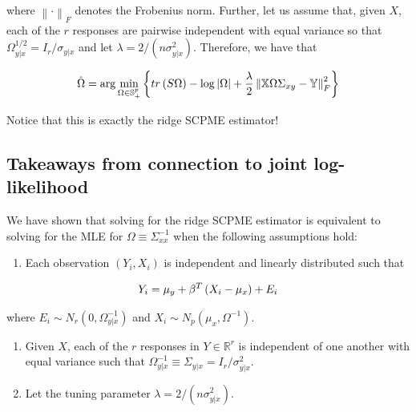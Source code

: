 \documentclass[11pt,]{report}
\providecommand{\tightlist}{%
  \setlength{\itemsep}{0pt}\setlength{\parskip}{0pt}}
\begin{document}
where \(\left\|\cdot\right\|_{F}\) denotes the Frobenius norm. Further, let us assume that, given \(X\), each of the \(r\) responses are pairwise independent with equal variance so that \(\Omega_{y | x}^{1/2} = I_{r}/\sigma_{y | x}\) and let \(\lambda = 2/(n\sigma_{y | x}^{2})\). Therefore, we have that

\begin{equation}
\hat{\Omega} = \arg\min_{\Omega \in \mathbb{S}_{+}^{p}}\left\{ tr\left( S\Omega \right) - \log\left| \Omega \right| + \frac{\lambda}{2}\left\| \mathbb{X}\Omega\Sigma_{xy} - \mathbb{Y} \right\|_{F}^{2} \right\}
\label{eq:omegajointmle}\notag
\end{equation}

Notice that this is exactly the ridge SCPME estimator!

\hypertarget{takeaways-from-connection-to-joint-log-likelihood}{%
\subsection{Takeaways from connection to joint log-likelihood}\label{takeaways-from-connection-to-joint-log-likelihood}}

We have shown that solving for the ridge SCPME estimator is equivalent to solving for the MLE for \(\Omega \equiv \Sigma_{xx}^{-1}\) when the following assumptions hold:

\begin{enumerate}
\def\labelenumi{\arabic{enumi}.}
\tightlist
\item
  Each observation \((Y_{i}, X_{i})\) is independent and linearly distributed such that
\end{enumerate}

\begin{equation}
Y_{i} = \mu_{y} + \beta^{T}\left(X_{i} - \mu_{x}\right) + E_{i}
\label{eq:linregression2}\notag
\end{equation}

where \(E_{i} \sim N_{r}\left( 0, \Omega_{y | x}^{-1} \right)\) and \(X_{i} \sim N_{p}\left( \mu_{x}, \Omega^{-1} \right)\).

\begin{enumerate}
\def\labelenumi{\arabic{enumi}.}
\setcounter{enumi}{1}
\item
  Given \(X\), each of the \(r\) responses in \(Y \in \mathbb{R}^{r}\) is independent of one another with equal variance such that \(\Omega_{y | x}^{-1} \equiv \Sigma_{y | x} = I_{r}/\sigma_{y | x}^{2}\).
\item
  Let the tuning parameter \(\lambda = 2/(n\sigma_{y | x}^{2})\).
\end{enumerate}
\end{document}
